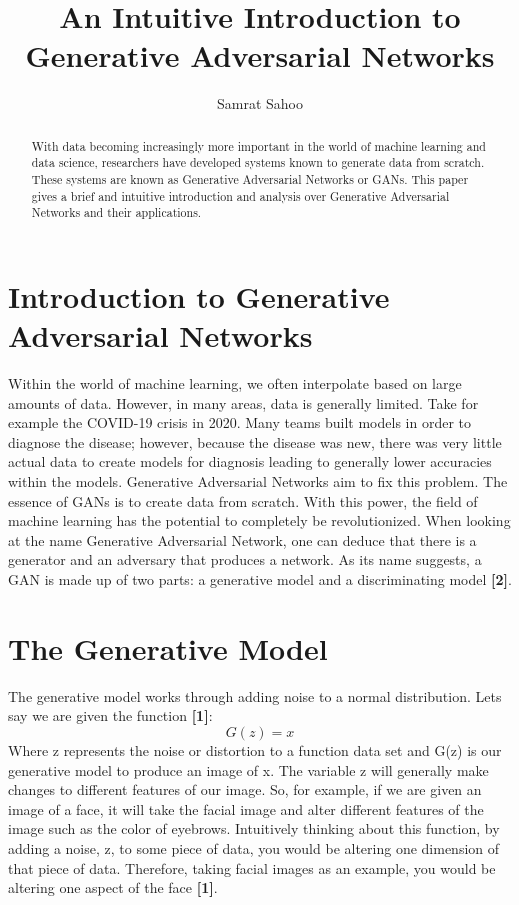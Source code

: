 \documentclass{cup-pan}
\title{An Intuitive Introduction to Generative Adversarial Networks}
\author[ ]{Samrat Sahoo}
\affil[ ]{UT Arlington}
\affil[ ]{Advisor: Professor Won Hwa Kim}
\affil[ ]{Email: \url{won.kim@uta.edu}}
\begin{document}
\maketitle
 
\begin{abstract}
With data becoming increasingly more important in the world of machine learning and data science, researchers have developed systems known to generate data from scratch. These systems are known as Generative Adversarial Networks or GANs. This paper gives a brief and intuitive introduction and analysis over Generative Adversarial Networks and their applications.

\end{abstract}

\section{Introduction to Generative Adversarial Networks}
\label{sec:overview}

 Within the world of machine learning, we often interpolate based on large amounts of data. However, in many areas, data is generally limited. Take for example the COVID-19 crisis in 2020. Many teams built models in order to diagnose the disease; however, because the disease was new, there was very little actual data to create models for diagnosis leading to generally lower accuracies within the models. Generative Adversarial Networks aim to fix this problem. The essence of GANs is to create data from scratch. With this power, the field of machine learning has the potential to completely be revolutionized. When looking at the name Generative Adversarial Network, one can deduce that there is a generator and an adversary that produces a network. As its name suggests, a GAN is made up of two parts: a generative model and a discriminating model \textbf{[2]}.

\section{The Generative Model}

The generative model works through adding noise to a normal distribution. Lets say we are given the function \textbf{[1]}:
\begin{equation}
G(z) = x
\end{equation}
Where z represents the noise or distortion to a function data set and G(z) is our generative model to produce an image of x. The variable z will generally make changes to different features of our image. So, for example, if we are given an image of a face, it will take the facial image and alter different features of the image such as the color of eyebrows. Intuitively thinking about this function, by adding a noise, z, to some piece of data, you would be altering one dimension of that piece of data. Therefore, taking facial images as an example, you would be altering one aspect of the face \textbf{[1]}.
\end{document}
